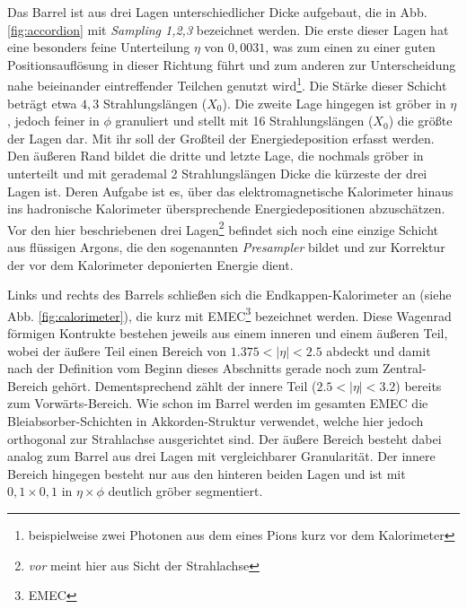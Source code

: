 Das Barrel ist aus drei Lagen unterschiedlicher Dicke aufgebaut, die in Abb.
\ref{fig:accordion} mit \textit{Sampling 1,2,3} bezeichnet werden. Die erste
dieser Lagen hat eine besonders feine Unterteilung $\eta$ von $0,0031$, was zum
einen zu einer guten Positionsauflösung in dieser Richtung führt und zum
anderen zur Unterscheidung nahe beieinander eintreffender Teilchen genutzt
wird\footnote{beispielweise zwei Photonen aus dem eines Pions kurz vor dem
Kalorimeter}. Die Stärke dieser Schicht beträgt etwa $4,3$ Strahlungslängen
($X_0$). Die zweite Lage hingegen ist gröber in $\eta$, jedoch feiner in $\phi$
granuliert und stellt mit 16 Strahlungslängen ($X_0$) die größte der Lagen dar.
Mit ihr soll der Großteil der Energiedeposition erfasst werden. Den äußeren
Rand bildet die dritte und letzte Lage, die nochmals gröber in unterteilt und
mit gerademal 2 Strahlungslängen Dicke die kürzeste der drei Lagen ist. Deren
Aufgabe ist es, über das elektromagnetische Kalorimeter hinaus ins hadronische
Kalorimeter übersprechende Energiedepositionen abzuschätzen. Vor den hier
beschriebenen drei Lagen\footnote{\textit{vor} meint hier aus Sicht der
Strahlachse} befindet sich noch eine einzige Schicht aus flüssigen Argons, die
den sogenannten \textit{Presampler} bildet und zur Korrektur der vor dem
Kalorimeter deponierten Energie dient.

Links und rechts des Barrels schließen sich die Endkappen-Kalorimeter an (siehe
Abb. \ref{fig:calorimeter}), die kurz mit EMEC\footnote{\acf{EMEC}} bezeichnet
werden. Diese Wagenrad förmigen Kontrukte bestehen jeweils aus einem inneren
und einem äußeren Teil, wobei der äußere Teil einen Bereich von
$1.375<|\eta|<2.5$ abdeckt und damit nach der Definition vom Beginn dieses
Abschnitts gerade noch zum Zentral-Bereich gehört. Dementsprechend zählt der
innere Teil ($2.5<|\eta|<3.2$) bereits zum Vorwärts-Bereich. Wie schon im
Barrel werden im gesamten \ac{EMEC} die Bleiabsorber-Schichten in
Akkorden-Struktur verwendet, welche hier jedoch orthogonal zur Strahlachse
ausgerichtet sind. Der äußere Bereich besteht dabei analog zum Barrel aus drei
Lagen mit vergleichbarer Granularität. Der innere Bereich hingegen besteht nur
aus den hinteren beiden Lagen  und ist mit $0,1\times0,1$ in $\eta\times\phi$
deutlich gröber segmentiert.

